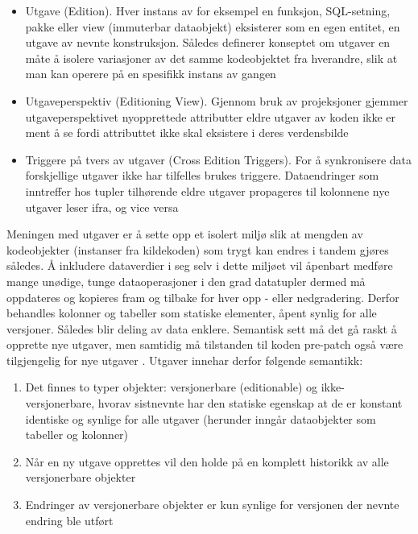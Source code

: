 \begin{itemize}
  \item Utgave (Edition). Hver instans av for eksempel en funksjon, SQL-setning, pakke eller view (immuterbar dataobjekt) eksisterer som en egen entitet, en utgave av nevnte konstruksjon. Således definerer konseptet om utgaver en måte å isolere variasjoner av det samme kodeobjektet fra hverandre, slik at man kan operere på en spesifikk instans av gangen
  \item Utgaveperspektiv (Editioning View). Gjennom bruk av projeksjoner gjemmer utgaveperspektivet nyopprettede attributter eldre utgaver av koden ikke er ment å se fordi attributtet ikke skal eksistere i deres verdensbilde
  \item Triggere på tvers av utgaver (Cross Edition Triggers). For å synkronisere data forskjellige utgaver ikke har tilfelles brukes triggere. Dataendringer som inntreffer hos tupler tilhørende eldre utgaver propageres til kolonnene nye utgaver leser ifra, og vice versa
\end{itemize}


Meningen med utgaver er å sette opp et isolert miljø slik at mengden av kodeobjekter (instanser fra kildekoden) som trygt kan endres i tandem gjøres således. Å inkludere dataverdier i seg selv i dette miljøet vil åpenbart medføre mange unødige, tunge dataoperasjoner i den grad datatupler dermed må oppdateres og kopieres fram og tilbake for hver opp - eller nedgradering. Derfor behandles kolonner og tabeller som statiske elementer, åpent synlig for alle versjoner. Således blir deling av data enklere. Semantisk sett må det gå raskt å opprette nye utgaver, men samtidig må tilstanden til koden pre-patch også være tilgjengelig for nye utgaver \citep{choi2009}. Utgaver innehar derfor følgende semantikk:

\begin{enumerate}
  \item Det finnes to typer objekter: versjonerbare (editionable) og ikke-versjonerbare, hvorav sistnevnte har den statiske egenskap at de er konstant identiske og synlige for alle utgaver (herunder inngår dataobjekter som tabeller og kolonner)
  \item Når en ny utgave opprettes vil den holde på en komplett historikk av alle versjonerbare objekter
  \item Endringer av versjonerbare objekter er kun synlige for versjonen der nevnte endring ble utført
\end{enumerate}

